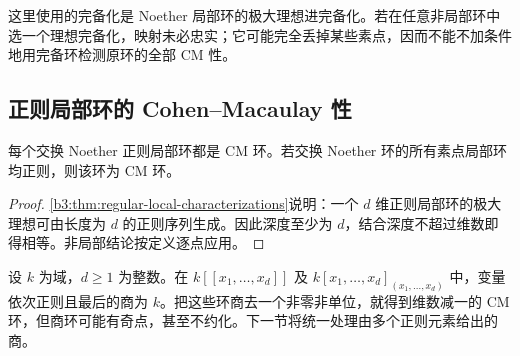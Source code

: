这里使用的完备化是 Noether 局部环的极大理想进完备化。若在任意非局部环中选一个理想完备化，映射未必忠实；它可能完全丢掉某些素点，因而不能不加条件地用完备环检测原环的全部 CM 性。

\subsection{正则局部环的 Cohen–Macaulay 性}
\label{b3:subsec:1902:03}

\begin{corollary}\label{b3:cor:regular-ring-cm}
	每个交换 Noether 正则局部环都是 CM 环。若交换 Noether 环的所有素点局部环均正则，则该环为 CM 环。
\end{corollary}
\begin{proof}
	\cref{b3:thm:regular-local-characterizations}说明：一个 \(d\) 维正则局部环的极大理想可由长度为 \(d\) 的正则序列生成。因此深度至少为 \(d\)，结合深度不超过维数即得相等。非局部结论按定义逐点应用。
\end{proof}

设 \(k\) 为域，\(d\ge1\) 为整数。在 \(k[\![x_1,\ldots,x_d]\!]\) 及 \(k[x_1,\ldots,x_d]_{(x_1,\ldots,x_d)}\) 中，变量依次正则且最后的商为 \(k\)。把这些环商去一个非零非单位，就得到维数减一的 CM 环，但商环可能有奇点，甚至不约化。下一节将统一处理由多个正则元素给出的商。
